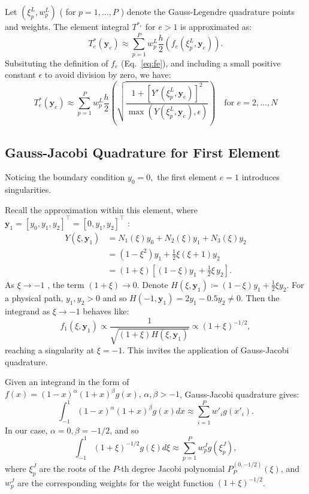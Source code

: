 \documentclass[11pt]{article}
\begin{document}
Let \( (\xi_{p}^{L}, w_{p}^{L}) \) ( for \( p = 1, \dots, P \) ) denote the Gauss-Legendre quadrature points and weights. The element integral \( T^{*_e}  \) for \( e > 1 \) is approximated as:  
\[ 
    T_e^*(\mathbf{y}_e) \approx \sum_{p=1}^{P} w_{p}^{L} \frac{h}{2} \left( f_e(\xi_{p}^{L}, \mathbf{y}_e)  \right).
\]
Subsituting the definition of \( f_e \) (Eq.~\eqref{eq:fe}), and including a small positive constant \( \epsilon \) to avoid division by zero, we have: 
\begin{equation}
    T_e^*(\mathbf{y}_e) \approx \sum_{p=1}^{P} w_{p}^{L} \frac{h}{2}  \left( \sqrt{\frac{1 + [Y'(\xi_{p}^{L}, \mathbf{y}_e)]^2}{ \max(Y(\xi_{p}^{L}, \mathbf{y}_e), \epsilon) }} \right) \quad \text{for } e = 2, \ldots, N \label{eq:Te*approx}
\end{equation}

\subsection{Gauss-Jacobi Quadrature for First Element}

Noticing the boundary condition \( y_{0} = 0, \) the first element \( e=1 \) introduces singularities. 

Recall the approximation within this element, where \( \mathbf{y}_1 = [y_0, y_1, y_2]^\top = [0, y_1, y_2]^\top \) :
\begin{align*}
    Y(\xi, \mathbf{y}_1) &= N_1(\xi)y_0 + N_2(\xi)y_1 + N_3(\xi)y_2 \\
    &= (1 - \xi^2)y_1 + \frac{1}{2}\xi(\xi+1)y_2 \\
    &= (1 + \xi)\left[(1-\xi) y_{1} + \frac{1}{2} \xi \, y_{2}\right].
\end{align*}
As \( \xi \to -1 \) , the term \( (1+\xi) \to 0 \). Denote \( H(\xi, \mathbf{y}_1) \coloneqq (1-\xi)y_1 + \frac{1}{2}\xi y_2 \). For a physical path, \( y_{1}, y_{2} > 0 \) and so \( H(-1, \mathbf{y}_1) = 2y_1 - 0.5y_2 \neq 0 \). 
Then the integrand as \( \xi \to -1 \) behaves like: 
\[ 
    f_1(\xi, \mathbf{y}_1) \propto \frac{1}{\sqrt{(1+\xi) H(\xi, \mathbf{y}_1)}} \propto (1+\xi)^{-1/2},
\]
reaching a singularity at \( \xi = -1 \). This invites the application of Gauss-Jacobi quadrature. 

Given an integrand in the form of \( f(x) = (1-x)^{\alpha} (1+x)^{\beta}  g(x), \, \alpha, \beta > -1  \), Gauss-Jacobi quadrature gives:  
\[ 
    \int_{-1}^{1} (1-x)^{\alpha} (1+x)^{\beta} g(x) dx \approx \sum_{i=1}^{P} w'_{i} g(x'_{i}).
\]
In our case,  \(\alpha=0, \beta=-1/2\), and so 
\[ 
    \int_{-1}^{1} (1+\xi)^{-1/2} g(\xi) d\xi \approx \sum_{p=1}^{P} w_{p}^{J} g(\xi_{p}^{J}) ,
\]
where \( \xi_{p}^{J} \) are the roots of the \( P\)-th degree Jacobi polynomial \( P_P^{(0, -1/2)}(\xi) \), and \( w_{p}^{J} \) are the corresponding weights for the weight function \( (1+\xi)^{-1/2} \).
\end{document}
